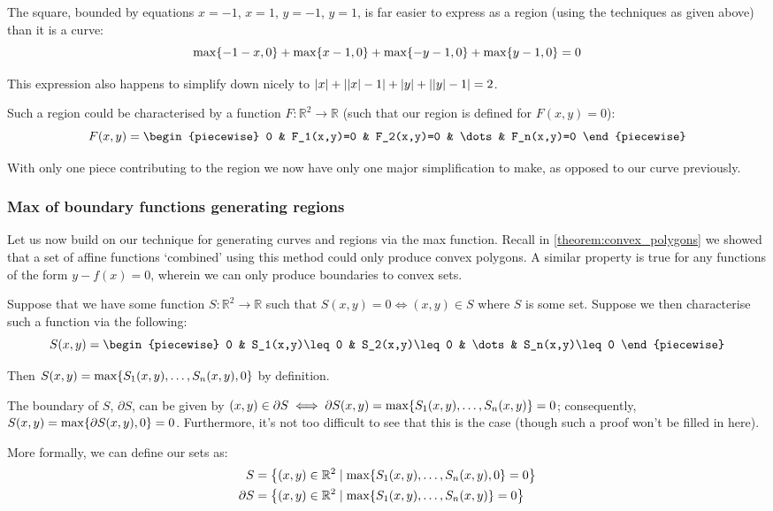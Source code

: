 \begin{example}
    The square, bounded by equations $x=-1$, $x=1$, $y=-1$, $y=1$, is far easier to express as a region (using the techniques as given above) than it is a curve:
    $$
        \max\br{-1-x,0}+\max\br{x-1,0}+\max\br{-y-1,0}+\max\br{y-1,0}=0
    $$

    This expression also happens to simplify down nicely to $\abs{x}+\abs{\abs{x}-1}+\abs{y}+\abs{\abs{y}-1}=2$.
\end{example}

Such a region could be characterised by a function $F:\mathbb{R}^2\to\mathbb{R}$ (such that our region is defined for $F(x,y)=0$):
$$
    F(x,y)=\begin{piecewise}
        0 & F_1(x,y)=0 & F_2(x,y)=0 & \dots & F_n(x,y)=0
    \end{piecewise}
$$

With only one piece contributing to the region we now have only one major simplification to make, as opposed to our curve previously.

\subsubsection{Max of boundary functions generating regions}
Let us now build on our technique for generating curves and regions via the max function. Recall in \ref{theorem:convex_polygons} we showed that a set of affine functions `combined' using this method could only produce convex polygons. A similar property is true for any functions of the form $y-f(x)=0$, wherein we can only produce boundaries to convex sets.

Suppose that we have some function $S:\mathbb{R}^2\to\mathbb{R}$ such that $S(x,y)=0\iff (x,y)\in S$ where $S$ is some set. Suppose we then characterise such a function via the following:
$$
    S(x,y)=\begin{piecewise}
        0 & S_1(x,y)\leq 0 & S_2(x,y)\leq 0 & \dots & S_n(x,y)\leq 0
    \end{piecewise}
$$

Then $S(x,y)=\max\br{S_1(x,y),\dots,S_n(x,y),0}$ by definition.

The boundary of $S$, $\partial S$, can be given by $(x,y)\in\partial S\iff \partial S(x,y)=\max\br{S_1(x,y),\dots,S_n(x,y)}=0$; consequently, $S(x,y)=\max\br{\partial S(x,y),0}=0$. Furthermore, it's not too difficult to see that this is the case (though such a proof won't be filled in here).

More formally, we can define our sets as:
\begin{align*}
    S &= \br*{(x,y)\in\mathbb{R}^2\mid \max\br{S_1(x,y),\dots,S_n(x,y),0}=0} \\
    \partial S &= \br*{(x,y)\in\mathbb{R}^2\mid \max\br{S_1(x,y),\dots,S_n(x,y)}=0} \\
\end{align*}

\newpage